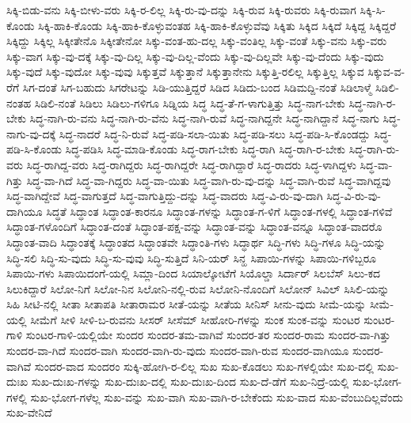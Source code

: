{ಸಿಕ್ಕಿ-ಬಿಡು-ವನು
ಸಿಕ್ಕಿ-ಬೀಳು-ವರು
ಸಿಕ್ಕಿ-ರ-ಲಿಲ್ಲ
ಸಿಕ್ಕಿ-ರು-ವು-ದನ್ನು
ಸಿಕ್ಕಿ-ರುವ
ಸಿಕ್ಕಿ-ರುವರು
ಸಿಕ್ಕಿ-ರುವಾಗ
ಸಿಕ್ಕಿ-ಸಿ-ಕೊಂಡು
ಸಿಕ್ಕಿ-ಹಾಕಿ-ಕೊಂಡು
ಸಿಕ್ಕಿ-ಹಾಕಿ-ಕೊಳ್ಳುವಂತಹ
ಸಿಕ್ಕಿ-ಹಾಕಿ-ಕೊಳ್ಳುವೆವು
ಸಿಕ್ಕಿತು
ಸಿಕ್ಕಿದ
ಸಿಕ್ಕಿದೆ
ಸಿಕ್ಕಿದ್ದ
ಸಿಕ್ಕಿದ್ದರೆ
ಸಿಕ್ಕಿದ್ದು
ಸಿಕ್ಕಿಲ್ಲ
ಸಿಕ್ಕೀತೇನೊ
ಸಿಕ್ಕೀತೇನೋ
ಸಿಕ್ಕು-ವಂತ-ಹು-ದಲ್ಲ
ಸಿಕ್ಕು-ವಂತಿಲ್ಲ
ಸಿಕ್ಕು-ವಂತೆ
ಸಿಕ್ಕು-ವನು
ಸಿಕ್ಕು-ವರು
ಸಿಕ್ಕು-ವಾಗ
ಸಿಕ್ಕು-ವು-ದಕ್ಕೆ
ಸಿಕ್ಕು-ವು-ದಿಲ್ಲ
ಸಿಕ್ಕು-ವು-ದಿಲ್ಲ-ವೆಂದು
ಸಿಕ್ಕು-ವು-ದಿಲ್ಲವೇ
ಸಿಕ್ಕು-ವು-ದೆಂದು
ಸಿಕ್ಕು-ವುದು
ಸಿಕ್ಕು-ವುದೆ
ಸಿಕ್ಕು-ವುದೋ
ಸಿಕ್ಕು-ವುವು
ಸಿಕ್ಕುತ್ತವೆ
ಸಿಕ್ಕುತ್ತಾನೆ
ಸಿಕ್ಕುತ್ತಾನೇನು
ಸಿಕ್ಕುತ್ತಿ-ರಲಿಲ್ಲ
ಸಿಕ್ಕುತ್ತಿಲ್ಲ
ಸಿಕ್ಕುವ
ಸಿಕ್ಕುವ-ವ-ರೆಗೆ
ಸಿಗ-ದಂತೆ
ಸಿಗ-ಬಹುದು
ಸಿಗರೇಟನ್ನು
ಸಿಡಿ-ಯುತ್ತಿದ್ದರೆ
ಸಿಡಿದ
ಸಿಡಿದು-ಬಂದ
ಸಿಡಿಮದ್ದಿ-ನಂತೆ
ಸಿಡಿಲಾಳ್ಮೆ
ಸಿಡಿಲಿ-ನಂತಹ
ಸಿಡಿಲಿ-ನಂತೆ
ಸಿಡಿಲು
ಸಿಡಿಲು-ಗಳಿಗೂ
ಸಿಡ್ನಿಯ
ಸಿದ್ಧ
ಸಿದ್ಧ-ತೆ-ಗ-ಳಾಗುತ್ತಿತ್ತು
ಸಿದ್ಧ-ನಾಗ-ಬೇಕು
ಸಿದ್ಧ-ನಾಗಿ-ರ-ಬೇಕು
ಸಿದ್ಧ-ನಾಗಿ-ರು-ವನು
ಸಿದ್ಧ-ನಾಗಿ-ರು-ವೆನು
ಸಿದ್ಧ-ನಾಗಿ-ರುವೆ
ಸಿದ್ಧ-ನಾಗಿದ್ದನೇ
ಸಿದ್ಧ-ನಾಗಿದ್ದಾನೆ
ಸಿದ್ಧ-ನಾಗು
ಸಿದ್ಧ-ನಾಗು-ವು-ದಕ್ಕೆ
ಸಿದ್ಧ-ನಾದರೆ
ಸಿದ್ಧ-ನಿ-ರುವೆ
ಸಿದ್ಧ-ಪಡಿ-ಸಲಾ-ಯಿತು
ಸಿದ್ಧ-ಪಡಿ-ಸಲು
ಸಿದ್ಧ-ಪಡಿ-ಸಿ-ಕೊಂಡದ್ದು
ಸಿದ್ಧ-ಪಡಿ-ಸಿ-ಕೊಂಡು
ಸಿದ್ಧ-ಪಡಿಸಿ
ಸಿದ್ಧ-ಮಾಡಿ-ಕೊಂಡು
ಸಿದ್ಧ-ರಾಗ-ಬೇಕು
ಸಿದ್ಧ-ರಾಗಿ
ಸಿದ್ಧ-ರಾಗಿ-ರ-ಬೇಕು
ಸಿದ್ಧ-ರಾಗಿ-ರು-ವರು
ಸಿದ್ಧ-ರಾಗಿದ್ದ-ವರು
ಸಿದ್ಧ-ರಾಗಿದ್ದರು
ಸಿದ್ಧ-ರಾಗಿದ್ದರೇ
ಸಿದ್ಧ-ರಾಗಿದ್ದಾರೆ
ಸಿದ್ಧ-ರಾದರು
ಸಿದ್ಧ-ಳಾಗಿದ್ದಳು
ಸಿದ್ಧ-ವಾ-ಗಿತ್ತು
ಸಿದ್ಧ-ವಾ-ಗಿದೆ
ಸಿದ್ಧ-ವಾ-ಗಿದ್ದರು
ಸಿದ್ಧ-ವಾ-ಯಿತು
ಸಿದ್ಧ-ವಾಗಿ-ರು-ವು-ದನ್ನು
ಸಿದ್ಧ-ವಾಗಿ-ರುವೆ
ಸಿದ್ಧ-ವಾಗಿದ್ದವು
ಸಿದ್ಧ-ವಾಗಿದ್ದೇವೆ
ಸಿದ್ಧ-ವಾಗುತ್ತದೆ
ಸಿದ್ಧ-ವಾಗುತ್ತಿದ್ದು-ದನ್ನು
ಸಿದ್ಧ-ವಾದರು
ಸಿದ್ಧ-ವಿ-ರು-ವು-ದಾಗಿ
ಸಿದ್ಧ-ವಿ-ರು-ವು-ದಾಗಿಯೂ
ಸಿದ್ಧತೆ
ಸಿದ್ಧಾಂತ
ಸಿದ್ಧಾಂತ-ಕಾರನೂ
ಸಿದ್ಧಾಂತ-ಗಳನ್ನು
ಸಿದ್ಧಾಂತ-ಗ-ಳಿಗೆ
ಸಿದ್ಧಾಂತ-ಗಳಲ್ಲಿ
ಸಿದ್ಧಾಂತ-ಗಳಿವೆ
ಸಿದ್ಧಾಂತ-ಗಳೊಂದಿಗೆ
ಸಿದ್ಧಾಂತ-ದಂತೆ
ಸಿದ್ಧಾಂತ-ಪಕ್ಷ-ವನ್ನು
ಸಿದ್ಧಾಂತ-ವನ್ನು
ಸಿದ್ಧಾಂತ-ವನ್ನೂ
ಸಿದ್ಧಾಂತ-ವಾದರೊ
ಸಿದ್ಧಾಂತ-ವಾದಿ
ಸಿದ್ಧಾಂತಕ್ಕೆ
ಸಿದ್ಧಾಂತದ
ಸಿದ್ಧಾಂತವೇ
ಸಿದ್ಧಾಂತಿ-ಗಳು
ಸಿದ್ಧಾರ್ಥ
ಸಿದ್ಧಿ-ಗಳು
ಸಿದ್ಧಿ-ಗಳೂ
ಸಿದ್ಧಿ-ಯನ್ನು
ಸಿದ್ಧಿ-ಸಲಿ
ಸಿದ್ಧಿ-ಸು-ವುದು
ಸಿದ್ಧಿ-ಸು-ವುವು
ಸಿದ್ಧಿ-ಸುತ್ತಿದೆ
ಸಿನಿ-ಯರ್
ಸಿನ್ಹ
ಸಿಪಾಯಿ-ಗಳನ್ನು
ಸಿಪಾಯಿ-ಗಳಿಬ್ಬರೂ
ಸಿಪಾಯಿ-ಗಳು
ಸಿಪಾಯಿದಂಗೆ-ಯಲ್ಲಿ
ಸಿಮ್ಲಾ-ದಿಂದ
ಸಿಯಾಲ್ಕೋಟೆಗೆ
ಸಿಯೊಲ್ಡಾ
ಸಿರ್ದಾರ್
ಸಿಲಬೆಸ್
ಸಿಲು-ಕದ
ಸಿಲುಕಿದ್ದಾರೆ
ಸಿಲೋ-ನಿಗೆ
ಸಿಲೋ-ನಿನ
ಸಿಲೋನಿ-ನಲ್ಲಿ-ರುವ
ಸಿಲೋನಿ-ನೊಂದಿಗೆ
ಸಿಲೋನ್
ಸಿವಿಲ್
ಸಿಸಿಲಿ-ಯನ್ನು
ಸಿಹಿ
ಸೀಟಿ-ನಲ್ಲಿ
ಸೀತಾ
ಸೀತಾಪತಿ
ಸೀತಾರಾಮರ
ಸೀತೆ-ಯನ್ನು
ಸೀತೆಯ
ಸೀನಿಸ್
ಸೀನು-ವುದು
ಸೀಮೆ-ಯನ್ನು
ಸೀಮೆ-ಯಲ್ಲಿ
ಸೀಮೆಗೆ
ಸೀಳಿ
ಸೀಳಿ-ಬ-ರುವನು
ಸೀಸರ್
ಸೀಸೆಮ್
ಸೀಹೋರಿ-ಗಳನ್ನು
ಸುಂಕ
ಸುಂಕ-ವನ್ನು
ಸುಂಟರ
ಸುಂಟರ-ಗಾಳಿ
ಸುಂಟರ-ಗಾಳಿ-ಯಲ್ಲಿಯೇ
ಸುಂದರ
ಸುಂದರ-ತಮ-ವಾಗಿವೆ
ಸುಂದರ-ತರ
ಸುಂದರ-ರಾಮ
ಸುಂದರ-ವಾ-ಗಿತ್ತು
ಸುಂದರ-ವಾ-ಗಿದೆ
ಸುಂದರ-ವಾಗಿ
ಸುಂದರ-ವಾಗಿ-ರು-ವುದು
ಸುಂದರ-ವಾಗಿ-ರುವ
ಸುಂದರ-ವಾಗಿಯೂ
ಸುಂದರ-ವಾಗಿವೆ
ಸುಂದರ-ವಾದ
ಸುಂದರಂ
ಸುಕ್ಕಿ-ಹೋಗಿ-ರ-ಲಿಲ್ಲ
ಸುಖ
ಸುಖ-ಕೊಡಲು
ಸುಖ-ಗಳಲ್ಲಿಯೇ
ಸುಖ-ದಲ್ಲಿ
ಸುಖ-ದುಃಖ
ಸುಖ-ದುಃಖ-ಗಳನ್ನು
ಸುಖ-ದುಃಖ-ದಲ್ಲಿ
ಸುಖ-ದುಃಖ-ದಿಂದ
ಸುಖ-ದೆ-ಡೆಗೆ
ಸುಖ-ನಿದ್ರೆ-ಯಲ್ಲಿ
ಸುಖ-ಭೋಗ-ಗಳಲ್ಲಿ
ಸುಖ-ಭೋಗ-ಗಳೆಲ್ಲ
ಸುಖ-ವನ್ನು
ಸುಖ-ವಾಗಿ
ಸುಖ-ವಾಗಿ-ರ-ಬೇಕೆಂದು
ಸುಖ-ವಾದ
ಸುಖ-ವೆಂಬುದಿಲ್ಲವೆಂದು
ಸುಖ-ವೇನಿದೆ
}
